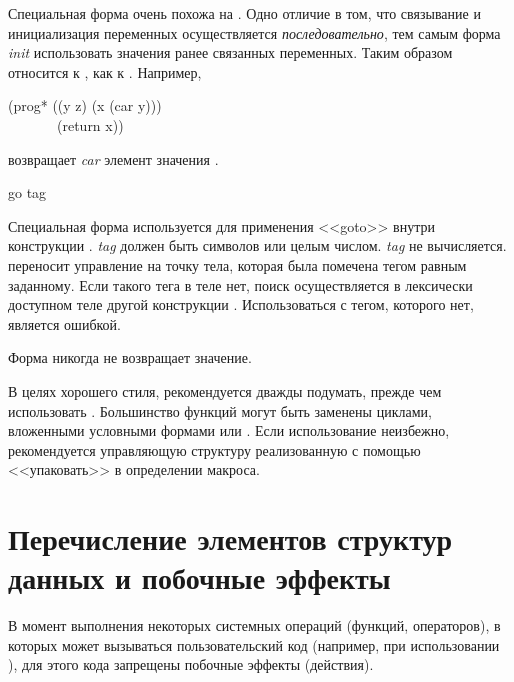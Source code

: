 \begin{defmac}
Специальная форма  очень похожа на . Одно отличие в том,
что связывание и инициализация переменных осуществляется \emph{последовательно},
тем самым форма \emph{init} использовать значения ранее связанных переменных.
Таким образом  относится к , как  к .
Например,
\begin{lisp}
(prog* ((y z) (x (car y))) \\
~~~~~~~(return x))
\end{lisp}
возвращает \emph{car} элемент значения .
\end{defmac}

\begin{defspec}
go tag

Специальная форма  используется для применения <<goto>>
внутри конструкции . \emph{tag} должен быть символов или целым
числом. \emph{tag} не вычисляется.
 переносит управление на точку тела, которая была помечена тегом равным
 заданному. Если такого тега в теле нет, поиск осуществляется в
лексически доступном теле другой конструкции .
Использоваться  с тегом, которого нет, является ошибкой.

Форма  никогда не возвращает значение.

В целях хорошего стиля, рекомендуется дважды подумать, прежде чем использовать
. Большинство функций  могут быть заменены циклами, вложенными
условными формами или . Если использование  неизбежно,
рекомендуется управляющую структуру реализованную с помощью  <<упаковать>>
в определении макроса. 
\end{defspec}

\section{Перечисление элементов структур данных и побочные эффекты}
\label{STRUCTURE-TRAVERSAL-SECTION}

В момент выполнения некоторых системных операций (функций, операторов), в
которых может вызываться пользовательский код (например, при использовании
), для этого кода запрещены побочные эффекты (действия).

